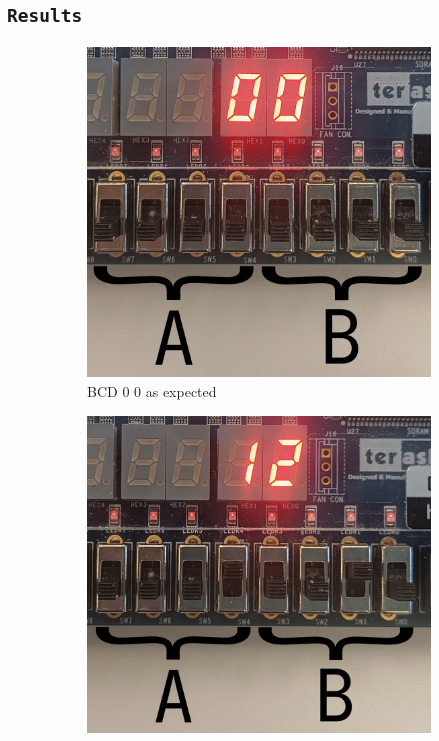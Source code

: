 \documentclass{article}
\let\oldsubsection\subsection
\renewcommand{\subsection}[1]{%
  \oldsubsection{\texttt{#1}}%
  \setcounter{subsubsection}{-1}%
}
\begin{document}
\subsection{Results}
\begin{figure}[h]
    \centering
    \begin{subfigure}{0.4\textwidth}
        \centering
        \includegraphics[width=1\textwidth]{Figures/Part1-0_0.jpg}
        \caption{BCD 0 0 as expected}
        \label{fig:T01pic1}
    \end{subfigure}
    \hfill
    \begin{subfigure}{0.4\textwidth}
        \centering
        \includegraphics[width=1\textwidth]{Figures/Part1-1_2.jpg}

\end{subfigure}
\end{figure}
\end{document}
